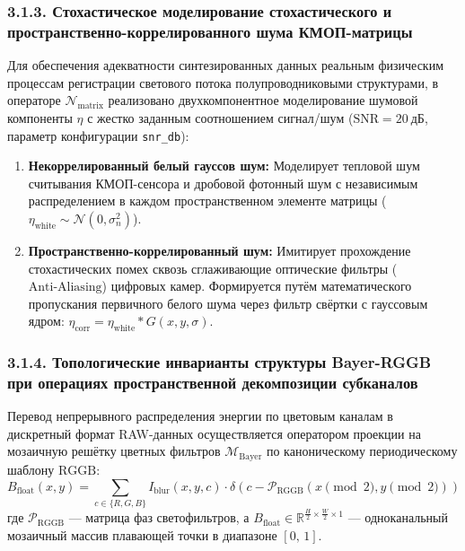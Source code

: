 \documentclass[12pt,a4paper]{article}
\begin{document}
\subsubsection{3.1.3. Стохастическое моделирование стохастического и пространственно-коррелированного шума КМОП-матрицы}

Для обеспечения адекватности синтезированных данных реальным физическим процессам регистрации светового потока полупроводниковыми структурами, в операторе $\mathcal{N}_{\operatorname{matrix}}$ реализовано двухкомпонентное моделирование шумовой компоненты $\eta$ с жестко заданным соотношением сигнал/шум ($\text{SNR} = 20~дБ$, параметр конфигурации \texttt{snr\_db}):
\begin{enumerate}
    \item \textbf{Некоррелированный белый гауссов шум:} Моделирует тепловой шум считывания КМОП-сенсора и дробовой фотонный шум с независимым распределением в каждом пространственном элементе матрицы ($\eta_{\text{white}} \sim \mathcal{N}(0, \sigma_n^2)$).
    \item \textbf{Пространственно-коррелированный шум:} Имитирует прохождение стохастических помех сквозь сглаживающие оптические фильтры ($\text{Anti-Aliasing}$) цифровых камер. Формируется путём математического пропускания первичного белого шума через фильтр свёртки с гауссовым ядром: $\eta_{\text{corr}} = \eta_{\text{white}} \ast G(x,y,\sigma)$.
\end{enumerate}

\subsubsection{3.1.4. Топологические инварианты структуры Bayer-RGGB при операциях пространственной декомпозиции субканалов}

Перевод непрерывного распределения энергии по цветовым каналам в дискретный формат RAW-данных осуществляется оператором проекции на мозаичную решётку цветных фильтров $\mathcal{M}_{\operatorname{Bayer}}$ по каноническому периодическому шаблону $\text{RGGB}$:
\begin{equation}
B_{\text{float}}(x,y) = \sum_{c \in \{R,G,B\}} I_{\text{blur}}(x,y,c) \cdot \delta\left(c - \mathcal{P}_{\operatorname{RGGB}}(x \pmod 2, y \pmod 2)\right)
\end{equation}
где $\mathcal{P}_{\operatorname{RGGB}}$ --- матрица фаз светофильтров, а $B_{\text{float}} \in \mathbb{R}^{\frac{H}{2} \times \frac{W}{2} \times 1}$ --- одноканальный мозаичный массив плавающей точки в диапазоне $[0,\, 1]$.
\end{document}
